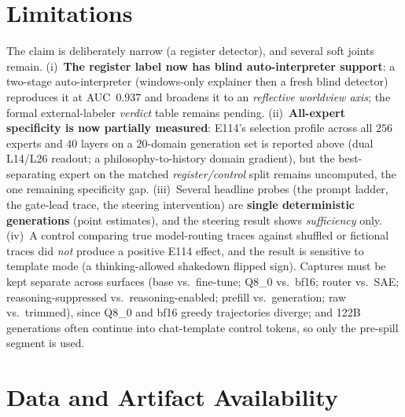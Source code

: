\documentclass[10pt,a4paper,twocolumn]{article}
\begin{document}
\section{Limitations}\label{sec:lim}

The claim is deliberately narrow (a register detector), and several soft joints
remain. (i)~\textbf{The register label now has blind auto-interpreter support}: a
two-stage auto-interpreter (windows-only explainer then a fresh blind detector)
reproduces it at AUC~$0.937$ and broadens it to an \emph{reflective worldview
axis}; the formal external-labeler
\emph{verdict} table remains pending. (ii)~\textbf{All-expert specificity is now
partially measured}: E114's selection profile across all $256$ experts and $40$
layers on a 20-domain generation set is reported above (dual L14/L26 readout; a
philosophy-to-history domain gradient), but the best-separating expert on the
matched \emph{register/control} split remains uncomputed, the one remaining
specificity gap. (iii)~Several headline
probes (the prompt ladder, the gate-lead trace, the steering intervention) are
\textbf{single deterministic generations} (point estimates), and the steering
result shows \emph{sufficiency} only. (iv)~A control comparing true model-routing
traces against shuffled or fictional traces did \emph{not} produce a positive
E114 effect, and the result is sensitive to template mode (a thinking-allowed
shakedown flipped sign). Captures must be kept separate across surfaces (base vs.\
fine-tune; Q8\_0 vs.\ bf16; router vs.\ SAE; reasoning-suppressed vs.\
reasoning-enabled; prefill vs.\ generation; raw vs.\ trimmed), since Q8\_0 and
bf16 greedy trajectories diverge; and 122B generations often continue into
chat-template control tokens, so only the pre-spill segment is used.

\section*{Data and Artifact Availability}
\end{document}
